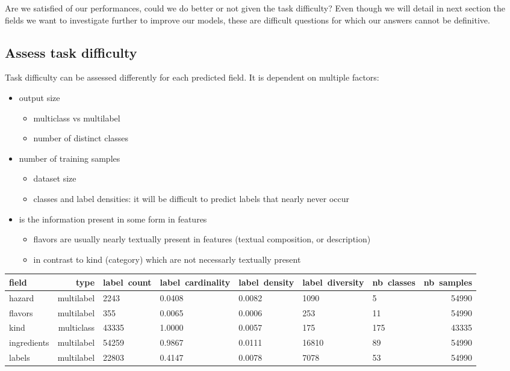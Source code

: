 Are we satisfied of our performances, could we do better or not given the task difficulty? Even though we will detail in next section the fields we want to investigate further to improve our models, these are difficult questions for which our answers cannot be definitive.

\subsection{Assess task difficulty}
Task difficulty can be assessed differently for each predicted field. It is dependent on multiple factors:
\begin{itemize}
	\item output size
	\begin{itemize}
		\item multiclass vs multilabel
		\item number of distinct classes
	\end{itemize}
	\item number of training samples
	\begin{itemize}
		\item dataset size
		\item classes and label densities: it will be difficult to predict labels that nearly never occur
	\end{itemize}
	\item is the information present in some form in features
	\begin{itemize}
		\item flavors are usually nearly textually present in features (textual composition, or description)
		\item in contrast to kind (category) which are not necessarly textually present
	\end{itemize}
\end{itemize}

\begin{tabularx}{\textwidth}{|l|r|X|X|X|X|X|r|}
\toprule
field & type &  label\ count & label\ cardinality &  label\ density &  label\ diversity &  nb\ classes &  nb\ samples \\
\midrule
hazard			      &          multilabel &    2243     &     0.0408 &         0.0082 &             1090 &           5 &       54990\\
flavors               &          multilabel &    355      &     0.0065 &         0.0006 &              253 &          11 &       54990 \\
kind                  &          multiclass &    43335    &     1.0000 &         0.0057 &              175 &         175 &       43335 \\
ingredients			  &          multilabel &    54259    &     0.9867 &         0.0111 &            16810 &          89 &       54990 \\
labels 		          &          multilabel &    22803    &     0.4147 &         0.0078 &             7078 &          53 &       54990 \\
\bottomrule
\end{tabularx}


